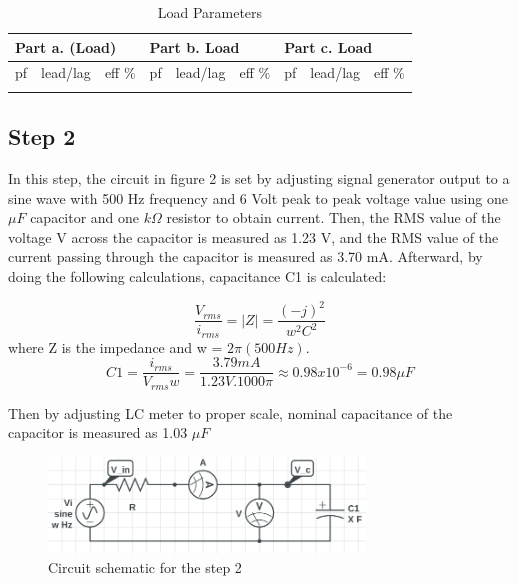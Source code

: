 \documentclass[letterpaper,12pt]{article}
\begin{document}
\begin{table}[H]
  \begin{center}
    \caption{Load Parameters}
    \vspace{2mm}
 \begin{tabular}{||lll|lll|lll||}
    \hline
    \multicolumn{3}{|l|}{Part a. (Load)}                            & \multicolumn{3}{l|}{Part b. Load}                            & \multicolumn{3}{l|}{Part c. Load}                            \\ \hline
    \multicolumn{1}{|l|}{pf} & \multicolumn{1}{l|}{lead/lag} & eff \(\%\) & \multicolumn{1}{l|}{pf} & \multicolumn{1}{l|}{lead/lag} &eff \(\%\)  & \multicolumn{1}{l|}{pf} & \multicolumn{1}{l|}{lead/lag} &eff \(\%\)  \\ \hline
    \multicolumn{1}{|l|}{} & \multicolumn{1}{l|}{} &  & \multicolumn{1}{l|}{} & \multicolumn{1}{l|}{} &  & \multicolumn{1}{l|}{} & \multicolumn{1}{l|}{} &  \\ \hline
    \end{tabular}
\end{center}

\end{table}
\subsection{Step 2}

In this step, the circuit in figure 2 is set by adjusting signal generator output to a sine wave with 500 Hz frequency and 6 Volt peak to peak voltage value using one \(\mu F\) capacitor and one \(k\Omega \) resistor to obtain current. Then, the RMS value of the voltage V across the capacitor is measured as 1.23 V, and the RMS value of the current passing through the capacitor is measured as 3.70 mA. Afterward, by doing the following calculations, capacitance C1 is calculated:

\[\frac{V_{rms}}{i_{rms}} = |Z| = \frac{(-j)^2}{w^2C^2}\]
where Z is the impedance and w = \(2\pi (500 Hz)\).  
\[C1 = \frac{i_{rms}}{V_{rms}w}  =  \frac{3.79 mA}{1.23 V . 1000\pi} \approx 0.98x10^{-6} = 0.98 \mu F\]

Then by adjusting LC meter to proper scale, nominal capacitance of the capacitor is measured as 1.03 \(\mu F\)
\begin{figure}[H]
    \centering
    \includegraphics[width = 0.75\textwidth]{2SCH.png}
    \caption{Circuit schematic for the step 2}
\end{figure} 
    
\end{document}
